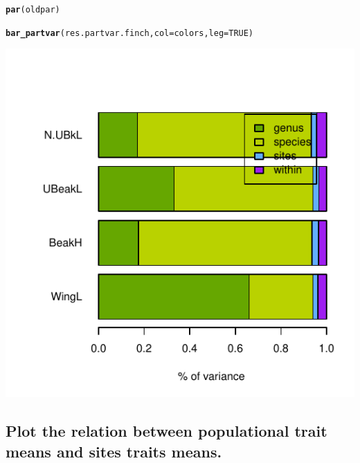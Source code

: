 \documentclass[12pt]{article}\usepackage[]{graphicx}\usepackage[]{color}
\makeatletter
\def\maxwidth{ %
  \ifdim\Gin@nat@width>\linewidth
    \linewidth
  \else
    \Gin@nat@width
  \fi
}
\newcommand{\hlnum}[1]{\textcolor[rgb]{0.686,0.059,0.569}{#1}}%
\newcommand{\hlstd}[1]{\textcolor[rgb]{0.345,0.345,0.345}{#1}}%
\newcommand{\hlkwc}[1]{\textcolor[rgb]{0.333,0.667,0.333}{#1}}%
\newcommand{\hlkwd}[1]{\textcolor[rgb]{0.737,0.353,0.396}{\textbf{#1}}}%
\newenvironment{kframe}{%
 \def\at@end@of@kframe{}%
 \ifinner\ifhmode%
  \def\at@end@of@kframe{\end{minipage}}%
  \begin{minipage}{\columnwidth}%
 \fi\fi%
 \def\FrameCommand##1{\hskip\@totalleftmargin \hskip-\fboxsep
 \colorbox{shadecolor}{##1}\hskip-\fboxsep
     \hskip-\linewidth \hskip-\@totalleftmargin \hskip\columnwidth}%
 \MakeFramed {\advance\hsize-\width
   \@totalleftmargin\z@ \linewidth\hsize
   \@setminipage}}%
 {\par\unskip\endMakeFramed%
 \at@end@of@kframe}
\newenvironment{knitrout}{}{} %
\makeatother
\begin{document}
\begin{knitrout}
{}


\begin{kframe}\begin{alltt}
\hlkwd{par}\hlstd{(oldpar)}

\hlkwd{bar_partvar}\hlstd{(res.partvar.finch,} \hlkwc{col} \hlstd{= colors,} \hlkwc{leg} \hlstd{=} \hlnum{TRUE}\hlstd{)}
\end{alltt}
\end{kframe}

{\centering \includegraphics[width=\maxwidth]{figure/unnamed-chunk-162} 

}



\end{knitrout}




\newpage

\subsection{Plot the relation between populational trait means and sites traits means.}
\end{document}
